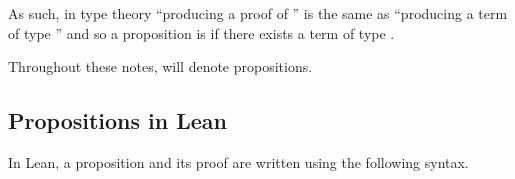 \documentclass[letterpaper,10pt,english]{sphinxmanual}
\begin{document}
\sphinxAtStartPar
As such, in type theory “producing a proof of ” is the same as “producing a term of type ”
and so a proposition  is  if there exists a term  of type .

\sphinxAtStartPar
{} Throughout these notes,  will denote propositions.


\subsection{Propositions in Lean}
\label{\detokenize{day1:propositions-in-lean}}
\sphinxAtStartPar
In Lean, a proposition and its proof are written using the following syntax.

\begin{sphinxVerbatim}[commandchars=\\\{\}]
 
    
      
                         
\end{sphinxVerbatim}
\end{document}

